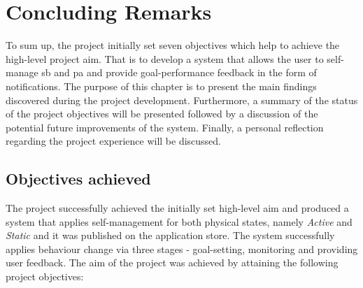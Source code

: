 \chapter{Concluding Remarks}
\label{chapter:conclusion}
To sum up, the project initially set seven objectives which help to achieve the high-level project aim. That is to develop a system that allows the user to self-manage \gls{sb} and \gls{pa} and provide goal-performance feedback in the form of notifications. The purpose of this chapter is to present the main findings discovered during the project development. Furthermore, a summary of the status of the project objectives will be presented followed by a discussion of the potential future improvements of the system. Finally, a personal reflection regarding the project experience will be discussed. 

\section{Objectives achieved}
The project successfully achieved the initially set high-level aim and produced a system that applies self-management for both physical states, namely \textit{Active} and \textit{Static} and it was published on the application store. The system successfully applies behaviour change via three stages - goal-setting, monitoring and providing user feedback. The aim of the project was achieved by attaining the following project objectives:

